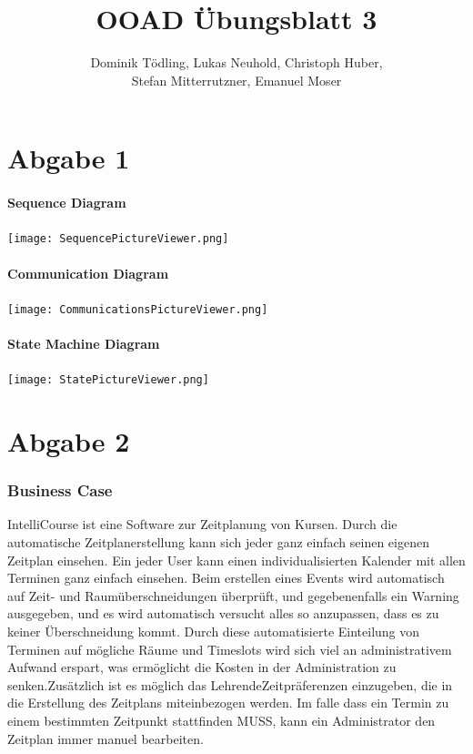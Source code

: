 \documentclass[a4paper,12pt]{article}
\title{OOAD Übungsblatt 3}
\author{Dominik Tödling, Lukas Neuhold, Christoph Huber,\\ Stefan Mitterrutzner, Emanuel Moser}
\begin{document}
\maketitle
\newpage
\part*{Abgabe 1}
\subsection*{Sequence Diagram}
\begin{center}
	\texttt{[image: SequencePictureViewer.png]}
\end{center}
\subsection*{Communication Diagram}
\begin{center}
	\texttt{[image: CommunicationsPictureViewer.png]}
\end{center}
\subsection*{State Machine Diagram}
\begin{center}
	\texttt{[image: StatePictureViewer.png]}
\end{center}
\newpage
\part*{Abgabe 2}
\section*{Business Case}
IntelliCourse ist eine Software zur Zeitplanung von Kursen. Durch die automatische Zeitplanerstellung kann sich jeder ganz einfach seinen eigenen Zeitplan einsehen. Ein jeder User kann einen individualisierten Kalender mit allen Terminen ganz einfach einsehen.  Beim erstellen eines Events wird automatisch auf Zeit- und Raumüberschneidungen überprüft, und gegebenenfalls ein Warning ausgegeben, und es wird automatisch versucht alles so anzupassen, dass es zu keiner Überschneidung kommt. Durch diese automatisierte Einteilung von Terminen auf mögliche Räume und Timeslots wird sich viel an administrativem Aufwand erspart, was ermöglicht die Kosten in der Administration zu senken.Zusätzlich ist es möglich das  LehrendeZeitpräferenzen einzugeben, die in die Erstellung des Zeitplans miteinbezogen werden. Im falle dass ein Termin zu einem bestimmten Zeitpunkt stattfinden MUSS, kann ein Administrator den Zeitplan immer manuel bearbeiten.
\end{document}
